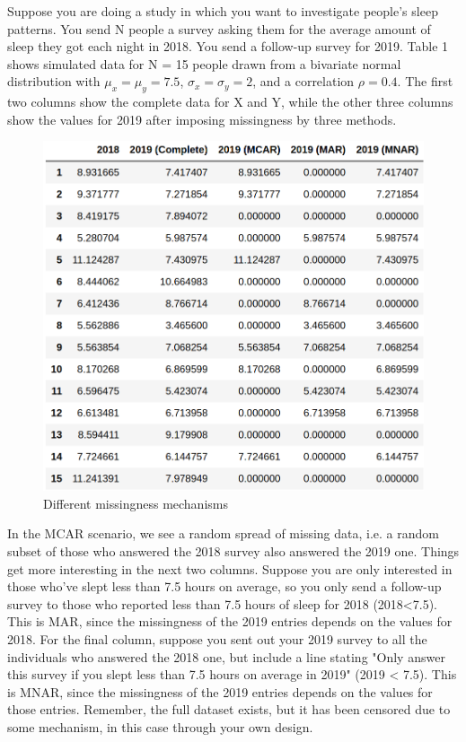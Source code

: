\documentclass{article}
\begin{document}
	Suppose you are doing a study in which you want to investigate people's sleep patterns. You send N people a survey asking them for the average amount of sleep they got each night in 2018. You send a follow-up survey for 2019. Table 1 shows simulated data for N = 15 people drawn from a bivariate normal distribution with $\mu_{x} = \mu_{y} = 7.5$, $\sigma_{x} = \sigma_{y} = 2$, and a correlation $\rho = 0.4$. The first two columns show the complete data for X and Y, while the other three columns show the values for 2019 after imposing missingness by three methods.
	
	\begin{figure}
		\centering
		\includegraphics[width=\linewidth]{missingness}
		\caption{Different missingness mechanisms}
		\label{fig:miss1}
	\end{figure}
	
	In the MCAR scenario, we see a random spread of missing data, i.e. a random subset of those who answered the 2018 survey also answered the 2019 one. Things get more interesting in the next two columns. Suppose you are only interested in those who've slept less than 7.5 hours on average, so you only send a follow-up survey to those who reported less than 7.5 hours of sleep for 2018 (2018<7.5). This is MAR, since the missingness of the 2019 entries depends on the values for 2018. For the final column, suppose you sent out your 2019 survey to all the individuals who answered the 2018 one, but include a line stating "Only answer this survey if you slept less than 7.5 hours on average in 2019" (2019 < 7.5). This is MNAR, since the missingness of the 2019 entries depends on the values for those entries. Remember, the full dataset exists, but it has been censored due to some mechanism, in this case through your own design. 
	
\end{document}
